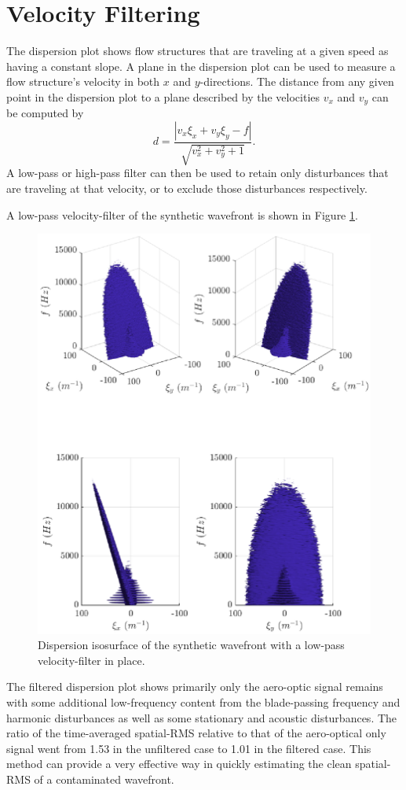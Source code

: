 \section{Velocity Filtering}
The dispersion plot shows flow structures that are traveling at a given speed as having a constant slope.
A plane in the dispersion plot can be used to measure a flow structure's velocity in both $x$ and $y$-directions.
The distance from any given point in the dispersion plot to a plane described by the velocities $v_x$ and $v_y$ can be computed by
\begin{equation}
 d = \frac{|v_x\xi_x+v_y\xi_y-f|}{\sqrt{v_x^2+v_y^2+1}} \textrm{.}
 \label{eqn:04_dist_point_2_plane}
\end{equation}
A low-pass or high-pass filter can then be used to retain only disturbances that are traveling at that velocity, or to exclude those disturbances respectively.

A low-pass velocity-filter of the synthetic wavefront is shown in Figure \ref{fig:04_filter_velocity}.
\begin{figure}
 \centering
 \includegraphics{../matlab/04_basic_filtering/filter_velocity.eps}
 \caption{Dispersion isosurface of the synthetic wavefront with a low-pass velocity-filter in place.}
 \label{fig:04_filter_velocity}
\end{figure}
The filtered dispersion plot shows primarily only the aero-optic signal remains with some additional low-frequency content from the blade-passing frequency and harmonic disturbances as well as some stationary and acoustic disturbances.
The ratio of the time-averaged spatial-RMS relative to that of the aero-optical only signal went from 1.53 in the unfiltered case to 1.01 in the filtered case.
This method can provide a very effective way in quickly estimating the clean spatial-RMS of a contaminated wavefront.

